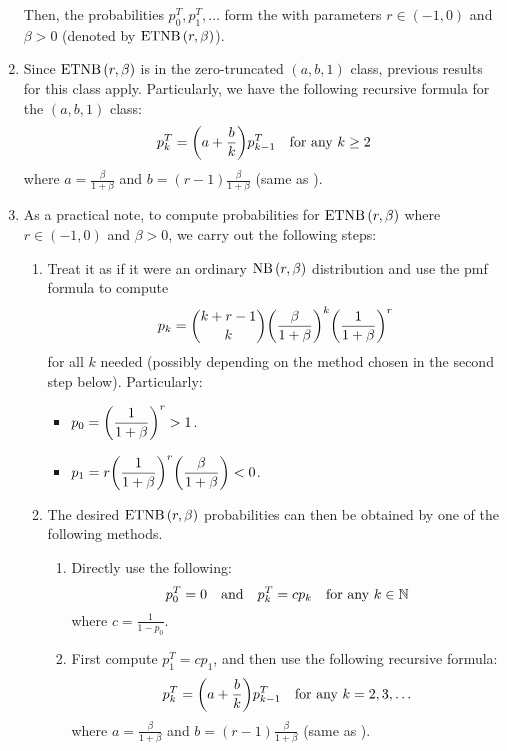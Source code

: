 \begin{enumerate}
Then, the probabilities \(p_0^T,p_1^T,\dotsc\) form the
 with parameters
\(r\in(-1,0)\) and \(\beta>0\) (denoted by \(\operatorname{ETNB}\left(r,\beta\right)\)).

\item Since \(\operatorname{ETNB}\left(r,\beta\right)\) is in the zero-truncated \((a,b,1)\) class,
previous results for this class apply. Particularly, we have the following
recursive formula for the \((a,b,1)\) class:
\[
p_k^T=\qty(a+\frac{b}{k})p_{k-1}^{T}\quad\text{for any \(k\ge 2\)}
\]
where \(\displaystyle a=\frac{\beta}{1+\beta}\) and \(\displaystyle
b=(r-1)\frac{\beta}{1+\beta}\) (same as ). 

\item \label{it:steps-compute-etnb-prob}
As a practical note, to compute probabilities for \(\operatorname{ETNB}\left(r,\beta\right)\)
where \(r\in(-1,0)\) and \(\beta>0\), we carry out the following steps:
\begin{enumerate}
\item Treat it as if it were an ordinary \(\operatorname{NB}\left(r,\beta\right)\) distribution and use
the pmf formula to compute
\[
p_k=\binom{k+r-1}{k}\qty(\frac{\beta}{1+\beta})^{k}\qty(\frac{1}{1+\beta})^{r}
\]
for all \(k\) needed (possibly depending on the method chosen in the second
step below).  Particularly:
\begin{itemize}
\item \(\displaystyle p_0=\qty(\frac{1}{1+\beta})^{r}>1\).
\item \(\displaystyle p_1=r\qty(\frac{1}{1+\beta})^{r}\qty(\frac{\beta}{1+\beta})<0\).
\end{itemize}
\item The desired \(\operatorname{ETNB}\left(r,\beta\right)\) probabilities can then be obtained by one
of the following methods.
\begin{enumerate}
\item Directly use the following:
\[
p_0^T=0\qqtext{and}p_k^T=cp_k\quad\text{for any \(k\in\N\)}
\]
where \(\displaystyle c=\frac{1}{1-p_0}\).
\item First compute \(p_1^T=cp_1\), and then use the following recursive
formula:
\[
p_k^T=\qty(a+\frac{b}{k})p_{k-1}^{T}\quad\text{for any \(k=2,3,\dotsc\)}
\]
where \(\displaystyle a=\frac{\beta}{1+\beta}\) and \(\displaystyle
b=(r-1)\frac{\beta}{1+\beta}\) (same as ).
\end{enumerate}
\end{enumerate}
\end{enumerate}
